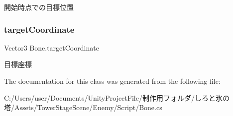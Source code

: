 開始時点での目標位置 

\mbox{\label{class_bone_a2fcc3eb5e79c0b3abcffb50e9a60cb33}} 
\subsubsection{\texorpdfstring{target\+Coordinate}{targetCoordinate}}
{\footnotesize\ttfamily Vector3 Bone.\+target\+Coordinate\hspace{0.3cm}{\ttfamily [private]}}



目標座標 



The documentation for this class was generated from the following file\+:\begin{DoxyCompactItemize}
\item 
C\+:/\+Users/user/\+Documents/\+Unity\+Project\+File/制作用フォルダ/しろと氷の塔/\+Assets/\+Tower\+Stage\+Scene/\+Enemy/\+Script/Bone.\+cs\end{DoxyCompactItemize}
